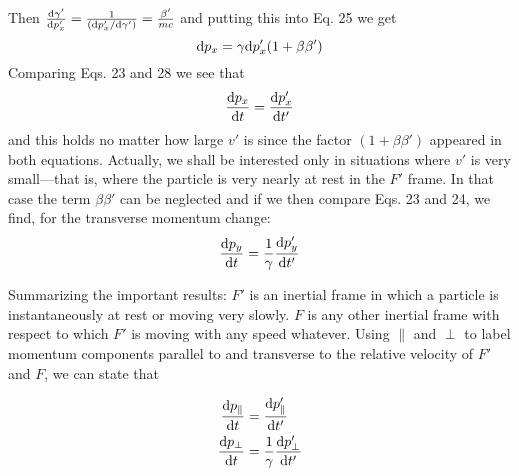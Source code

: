 Then $\frac{\textup{d}\gamma'}{\textup{d} p_x'}=\frac{1}{(\textup{d} p_x'/\textup{d}\gamma')}=\frac{\beta'}{mc}$
and putting this into Eq. 25 we get
\begin{equation}
  \textup{d} p_x = \gamma \textup{d} p_x'(1+\beta\beta')
\end{equation}
Comparing Eqs. 23 and 28 we see that
\begin{equation}
  \frac{\textup{d} p_x}{\textup{d} t} = \frac{\textup{d} p_x'}{\textup{d} t'}
\end{equation}
and this holds no matter how large $v'$ is since the factor $(1+\beta\beta')$
appeared in both equations. Actually, we shall be interested only in
situations where $v'$ is very small---that is, where the particle is very
nearly at rest in the $F'$ frame. In that case the term $\beta\beta'$ can be neglected
and if we then compare Eqs. 23 and 24, we find, for the transverse
momentum change:
\begin{equation}
  \frac{\textup{d} p_y}{\textup{d} t} = \frac{1}{\gamma}\frac{\textup{d} p_y'}{\textup{d} t'}
\end{equation}

Summarizing the important results: $F'$ is an inertial frame in
which a particle is instantaneously at rest or moving very slowly. $F$ is
any other inertial frame with respect to which $F'$ is moving with any
speed whatever. Using $\parallel$ and $\perp$ to label momentum components
parallel to and transverse to the relative velocity of $F'$
and $F$, we can state that
\begin{framed}
\begin{align}
\begin{split}
  \frac{\textup{d} p_\parallel}{\textup{d} t} &=   \frac{\textup{d} p_\parallel'}{\textup{d} t'} \\
  \frac{\textup{d} p_\perp}{\textup{d} t} &=   \frac{1}{\gamma}\frac{\textup{d} p_\perp'}{\textup{d} t'} 
\end{split}
\end{align}
\end{framed}

